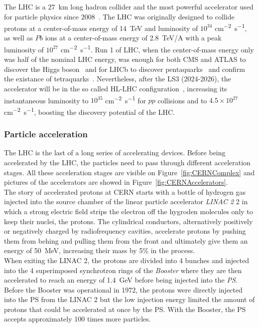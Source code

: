 	The LHC is a \SI{27}{km} long hadron collider and the most powerful accelerator used for particle physics since 2008~\cite{LHC2008}. The LHC was originally designed to collide protons at a center-of-mass energy of \SI{14}{TeV} and luminosity of $10^{34}$ \si{cm^{-2}s^{-1}}, as well as $Pb$ ions at a center-of-mass energy of \SI{2.8}{TeV/A} with a peak luminosity of $10^{27}$ \si{cm^{-2}s^{-1}}. Run 1 of LHC, when the center-of-mass energy only was half of the nominal LHC energy, was enough for both CMS and ATLAS to discover the Higgs boson~\cite{HIGGS2015} and for LHCb to discover pentaquarks~\cite{PENTAQUARK2015} and confirm the existance of tetraquarks~\cite{TETRAQUARK2017}. Nevertheless, after the \acf{LS3} (2024-2026), the accelerator will be in the so called \acf{HL-LHC} configuration~\cite{HLLHC2017}, increasing its instantaneous luminosity to $10^{35}$ \si{cm^{-2}s^{-1}} for $pp$ collisions and to $4.5\times 10^{27}$ \si{cm^{-2}s^{-1}}, boosting the discovery potential of the LHC.
	
		\subsubsection{Particle acceleration}
		\label{chapt2:sssec:acceleration}
	
	The LHC is the last of a long series of accelerating devices. Before being accelerated by the LHC, the particles need to pass through different acceleration stages. All these acceleration stages are visible on Figure~\ref{fig:CERNComplex} and pictures of the accelerators are showed in Figure~\ref{fig:CERNAccelerators}.\\
	
	The story of accelerated protons at CERN starts with a bottle of hydrogen gas injected into the source chamber of the linear particle accelerator \textit{LINAC 2} 2 in which a strong electric field strips the electron off the hygroden molecules only to keep their nuclei, the protons. The cylindrical conductors, alternatively positively or negatively charged by radiofrequency cavities, accelerate protons by pushing them from behing and pulling them from the front and ultimately give them an energy of \SI{50}{MeV}, increasing their mass by 5\% in the process.\\
	
	When exiting the LINAC 2, the protons are divided into 4 bunches and injected into the 4 superimposed synchrotron rings of the \textit{Booster} where they are then accelerated to reach an energy of \SI{1.4}{GeV} before being injected into the \textit{PS}. Before the Booster was operational in 1972, the protons were directly injected into the PS from the LINAC 2 but the low injection energy limited the amount of protons that could be accelerated at once by the PS. With the Booster, the PS accepts approximately 100 times more particles.\\
	

